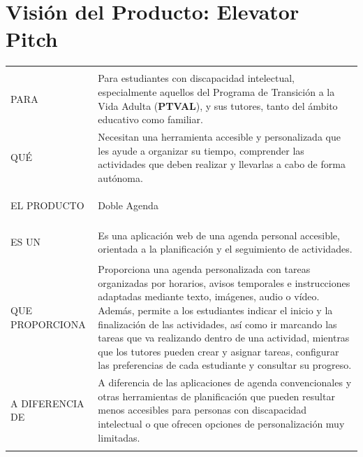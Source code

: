 \section{Visión del Producto: Elevator Pitch}

\vspace{0.3cm}

\begingroup
\renewcommand{\arraystretch}{1.6}
\setlength{\arrayrulewidth}{1pt} %
\setlength{\tabcolsep}{10pt}     %

\begin{xltabular}{\linewidth}{| >{\bfseries\sffamily\color{black}} p{3.8cm} | X |}
    \hline
     \\ \hhline{|==|}
    
    PARA & Para estudiantes con discapacidad intelectual, especialmente aquellos del Programa de Transición a la Vida Adulta (\textbf{PTVAL}), y sus tutores, tanto del ámbito educativo como familiar. \\ \hhline{|--|}
    
    QUÉ & Necesitan una herramienta accesible y personalizada que les ayude a organizar su tiempo, comprender las actividades que deben realizar y llevarlas a cabo de forma autónoma. \\ \hhline{|--|}
    
    EL PRODUCTO & Doble Agenda\\ \hhline{|--|}
    
    ES UN & Es una aplicación web de una agenda personal accesible, orientada a la planificación y el seguimiento de actividades. \\ \hhline{|--|}
    
    QUE \newline PROPORCIONA & Proporciona una agenda personalizada con tareas organizadas por horarios, avisos temporales e instrucciones adaptadas mediante texto, imágenes, audio o vídeo. Además, permite a los estudiantes indicar el inicio y la finalización de las actividades, así como ir marcando las tareas que va realizando dentro de una actividad, mientras que los tutores pueden crear y asignar tareas, configurar las preferencias de cada estudiante y consultar su progreso. \\ \hhline{|--|}
    
    A DIFERENCIA DE & A diferencia de las aplicaciones de agenda convencionales y otras herramientas de planificación que pueden resultar menos accesibles para personas con discapacidad intelectual o que ofrecen opciones de personalización muy limitadas. \\ \hhline{|--|}
    

\end{xltabular}
